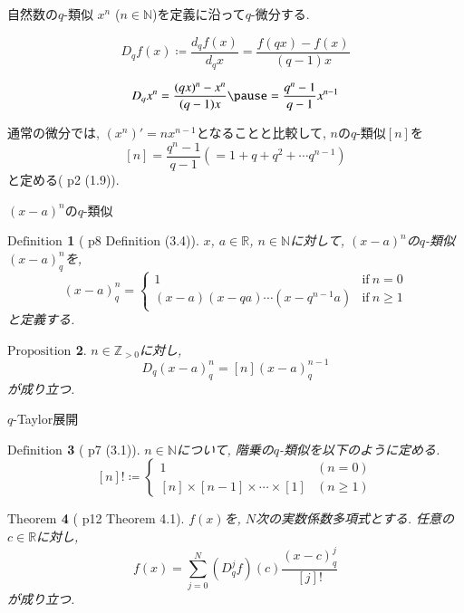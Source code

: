 \documentclass[dvipdfmx,cjk]{beamer}
\theoremstyle{mystyle}
\newtheorem{df}{$\textrm{Definition}$}[section]
\newtheorem{prop}[df]{$\textrm{Proposition}$}
\newtheorem{thm}[df]{$\textrm{Theorem}$}
\newcommand{\N}{\mathbb{N}}
\newcommand{\Z}{\mathbb{Z}}
\newcommand{\R}{\mathbb{R}}
\newcommand{\0}{\textbf{0}}
\begin{document}
%

\begin{frame}{自然数の$q$-類似}
	$x^n$ ($n \in \N$)を定義に沿って$q$-微分する. \pause
	\begin{screen}
		\[
			D_q f(x) \coloneqq \frac{d_q f(x)}{d_q x} = \frac{f(qx) - f(x)}{(q - 1) x}
		\]
	\end{screen} \pause
	\[
		D_q x^n = \frac{(qx)^n - x^n}{(q - 1) x} \pause
					= \frac{q^n - 1}{q - 1} x^{n - 1}
	\] \pause
  
  通常の微分では, $(x^n)' = n x^{n - 1}$となることと比較して, \pause
  $n$の$q$-類似$[n]$を
  \[
    [n] = \frac{q^n - 1}{q - 1} (= 1 + q + q^2 + \cdots q^{n - 1})
  \]
  と定める(\cite{Kac} p2 (1.9)).
\end{frame}

\begin{frame}{$(x - a)^n$の$q$-類似} 
	\begin{df}[\cite{Kac} p8 Definition (3.4)]
	  $x$, $a \in \R$, $n \in \N$に対して, $(x - a)^n$の$q$-類似$(x - a)^n_q$を, 
	  \[
	  (x - a)^n_q = \begin{cases}
	                      1 & \text{if}\ n = 0 \\
	                      (x - a) (x - qa) \cdots (x - q^{n - 1} a) & \text{if}\ n \ge 1
	                    \end{cases}
	  \]
	  と定義する. 
	\end{df} \pause
	\begin{prop} \label{Dq_qbinom_nonneg}
	  $n\in\Z_{>0}$に対し, 
	  \[
	    D_q(x-a)^n_q = [n](x-a)^{n-1}_q
	  \]
	  が成り立つ. 
	\end{prop}
\end{frame}

%

\begin{frame}{$q$-Taylor展開}
	\begin{df}[\cite{Kac} p7 (3.1)]
		$n \in \N$について, 階乗の$q$-類似を以下のように定める. 
    \[
      [n]! \coloneqq \begin{cases}
                            1 & (n=0)\\
                            [n]\times[n-1]\times\cdots\times[1] & (n\ge1)
                          \end{cases}
    \]
  \end{df} \pause
  \begin{thm}[\cite{Kac} p12 Theorem 4.1] \label{q_Taylor}
	 $f(x)$を, $N$次の実数係数多項式とする. 任意の$c\in\R$に対し, 
	 \[
	   f(x) = \sum_{j=0}^N (D_q^jf)(c)\frac{(x-c)^j_q}{[j]!}
	 \]
	 が成り立つ. 
  \end{thm}
\end{frame}
\end{document}
